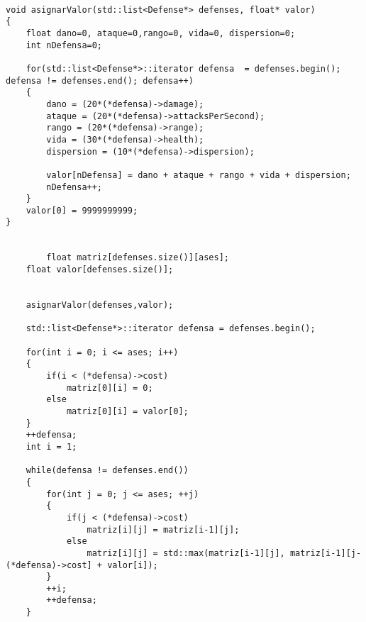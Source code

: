 \begin{lstlisting}

void asignarValor(std::list<Defense*> defenses, float* valor)
{
	float dano=0, ataque=0,rango=0, vida=0, dispersion=0;
	int nDefensa=0;

	for(std::list<Defense*>::iterator defensa  = defenses.begin(); defensa != defenses.end(); defensa++)
	{
		dano = (20*(*defensa)->damage);
		ataque = (20*(*defensa)->attacksPerSecond);
		rango = (20*(*defensa)->range);
		vida = (30*(*defensa)->health);
		dispersion = (10*(*defensa)->dispersion);

		valor[nDefensa] = dano + ataque + rango + vida + dispersion;
		nDefensa++;
	}
	valor[0] = 9999999999;
}


    	float matriz[defenses.size()][ases];
	float valor[defenses.size()];

	
	asignarValor(defenses,valor);

	std::list<Defense*>::iterator defensa = defenses.begin();

	for(int i = 0; i <= ases; i++)
	{
		if(i < (*defensa)->cost)
			matriz[0][i] = 0;
		else
			matriz[0][i] = valor[0];
	}
	++defensa;
	int i = 1;

	while(defensa != defenses.end())
	{
		for(int j = 0; j <= ases; ++j)
		{
			if(j < (*defensa)->cost)
				matriz[i][j] = matriz[i-1][j];
			else
				matriz[i][j] = std::max(matriz[i-1][j], matriz[i-1][j-(*defensa)->cost] + valor[i]);
		}
		++i;
		++defensa;
	}

\end{lstlisting}
